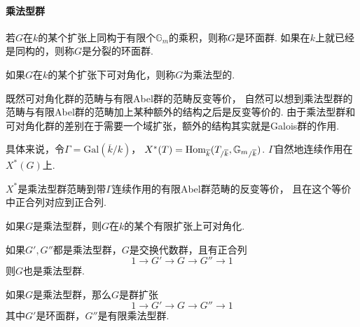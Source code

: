 
\paragraph*{乘法型群}

\begin{cdef}
    若$G$在$k$的某个扩张上同构于有限个$\mathbb{G}_m$的乘积，则称$G$是环面群. 如果在$k$上就已经是同构的，则称$G$是分裂的环面群.

    如果$G$在$k$的某个扩张下可对角化，则称$G$为乘法型的.
\end{cdef}

既然可对角化群的范畴与有限Abel群的范畴反变等价，
自然可以想到乘法型群的范畴与有限Abel群的范畴加上某种额外的结构之后是反变等价的.
由于乘法型群和可对角化群的差别在于需要一个域扩张，额外的结构其实就是Galois群的作用.

具体来说，令$\Gamma = \mathrm{Gal}(\overline{k}/k)$，
$X^{*}(T) = \mathrm{Hom}_{\overline{k}}({T}_{/\overline{k}}, {\mathbb{G}_m}_{/\overline{k}})$.
$\Gamma$自然地连续作用在$X^{*}(G)$上.
\begin{cprop}
    $X^{*}$是乘法型群范畴到带$\Gamma$连续作用的有限Abel群范畴的反变等价，
    且在这个等价中正合列对应到正合列.
\end{cprop}

\begin{cprop}
    如果$G$是乘法型群，则$G$在$k$的某个有限扩张上可对角化.
\end{cprop}

\begin{cprop}
    如果$G',G''$都是乘法型群，$G$是交换代数群，且有正合列
    \begin{equation}
        1\to G'\to G\to G''\to 1
    \end{equation}
    则$G$也是乘法型群.
\end{cprop}


\begin{cprop}
    如果$G$是乘法型群，那么$G$是群扩张
    \begin{equation}
        1\to G'\to G\to G''\to 1
    \end{equation}
    其中$G'$是环面群，$G''$是有限乘法型群.
\end{cprop}

